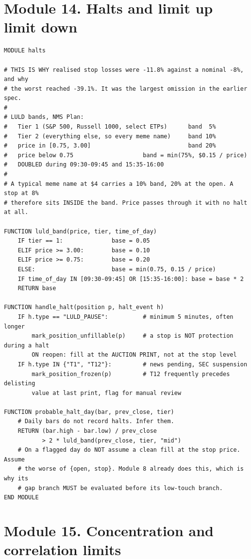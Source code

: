 \documentclass[10pt]{article}
\begin{document}
\section{Module 14. Halts and limit up limit down}

\begin{lstlisting}
MODULE halts

# THIS IS WHY realised stop losses were -11.8% against a nominal -8%, and why
# the worst reached -39.1%. It was the largest omission in the earlier spec.
#
# LULD bands, NMS Plan:
#   Tier 1 (S&P 500, Russell 1000, select ETPs)      band  5%
#   Tier 2 (everything else, so every meme name)     band 10%
#   price in [0.75, 3.00]                            band 20%
#   price below 0.75                    band = min(75%, $0.15 / price)
#   DOUBLED during 09:30-09:45 and 15:35-16:00
#
# A typical meme name at $4 carries a 10% band, 20% at the open. A stop at 8%
# therefore sits INSIDE the band. Price passes through it with no halt at all.

FUNCTION luld_band(price, tier, time_of_day)
    IF tier == 1:              base = 0.05
    ELIF price >= 3.00:        base = 0.10
    ELIF price >= 0.75:        base = 0.20
    ELSE:                      base = min(0.75, 0.15 / price)
    IF time_of_day IN [09:30-09:45] OR [15:35-16:00]: base = base * 2
    RETURN base

FUNCTION handle_halt(position p, halt_event h)
    IF h.type == "LULD_PAUSE":          # minimum 5 minutes, often longer
        mark_position_unfillable(p)     # a stop is NOT protection during a halt
        ON reopen: fill at the AUCTION PRINT, not at the stop level
    IF h.type IN {"T1", "T12"}:         # news pending, SEC suspension
        mark_position_frozen(p)         # T12 frequently precedes delisting
        value at last print, flag for manual review

FUNCTION probable_halt_day(bar, prev_close, tier)
    # Daily bars do not record halts. Infer them.
    RETURN (bar.high - bar.low) / prev_close
           > 2 * luld_band(prev_close, tier, "mid")
    # On a flagged day do NOT assume a clean fill at the stop price. Assume
    # the worse of {open, stop}. Module 8 already does this, which is why its
    # gap branch MUST be evaluated before its low-touch branch.
END MODULE
\end{lstlisting}

\section{Module 15. Concentration and correlation limits}
\end{document}
